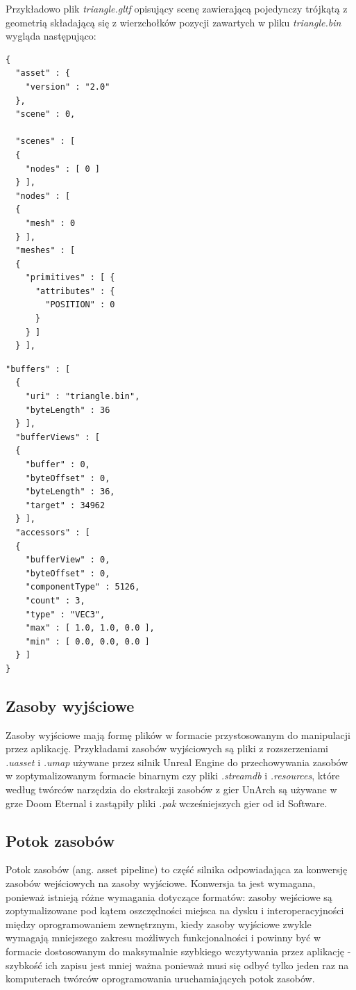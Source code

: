 Przykładowo plik \textit{triangle.gltf} opisujący scenę zawierającą pojedynczy trójkątą z geometrią składającą się z wierzchołków pozycji zawartych w pliku \textit{triangle.bin} wygląda następująco:

\noindent\begin{minipage}{.35\textwidth}
\lstset{language=JSON}
\begin{lstlisting}
{
  "asset" : {
    "version" : "2.0"
  },
  "scene" : 0,
  
  "scenes" : [
  {
    "nodes" : [ 0 ]
  } ],
  "nodes" : [
  {
    "mesh" : 0
  } ],
  "meshes" : [
  {
    "primitives" : [ {
      "attributes" : {
        "POSITION" : 0
      }
    } ]
  } ],
\end{lstlisting}
\end{minipage}\hfill
\begin{minipage}{.55\textwidth}
\lstset{language=JSON}
\begin{lstlisting}[frame=l]
  "buffers" : [
  {
    "uri" : "triangle.bin",
    "byteLength" : 36
  } ],
  "bufferViews" : [
  {
    "buffer" : 0,
    "byteOffset" : 0,
    "byteLength" : 36,
    "target" : 34962
  } ],
  "accessors" : [
  {
    "bufferView" : 0,
    "byteOffset" : 0,
    "componentType" : 5126,
    "count" : 3,
    "type" : "VEC3",
    "max" : [ 1.0, 1.0, 0.0 ],
    "min" : [ 0.0, 0.0, 0.0 ]
  } ]
}
\end{lstlisting}
\end{minipage}

\subsection{Zasoby wyjściowe}

Zasoby wyjściowe mają formę plików w formacie przystosowanym do manipulacji przez aplikację. Przykładami zasobów wyjściowych są pliki z rozszerzeniami \textit{.uasset} i \textit{.umap} używane przez silnik Unreal Engine \cite{unrealengine} do przechowywania zasobów w zoptymalizowanym formacie binarnym czy pliki \textit{.streamdb} i \textit{.resources}, które według twórców narzędzia do ekstrakcji zasobów z gier UnArch \cite{UNARCH} są używane w grze Doom Eternal i zastąpiły pliki \textit{.pak} wcześniejszych gier od id Software.


\subsection{Potok zasobów}

Potok zasobów (ang. asset pipeline) to część silnika odpowiadająca za konwersję zasobów wejściowych na zasoby wyjściowe.
Konwersja ta jest wymagana, ponieważ istnieją różne wymagania dotyczące formatów: zasoby wejściowe są zoptymalizowane pod kątem oszczędności miejsca na dysku i interoperacyjności między oprogramowaniem zewnętrznym, kiedy zasoby wyjściowe zwykle wymagają mniejszego zakresu możliwych funkcjonalności i powinny być w formacie dostosowanym do maksymalnie szybkiego wczytywania przez aplikację - szybkość ich zapisu jest mniej ważna ponieważ musi się odbyć tylko jeden raz na komputerach twórców oprogramowania uruchamiających potok zasobów.

